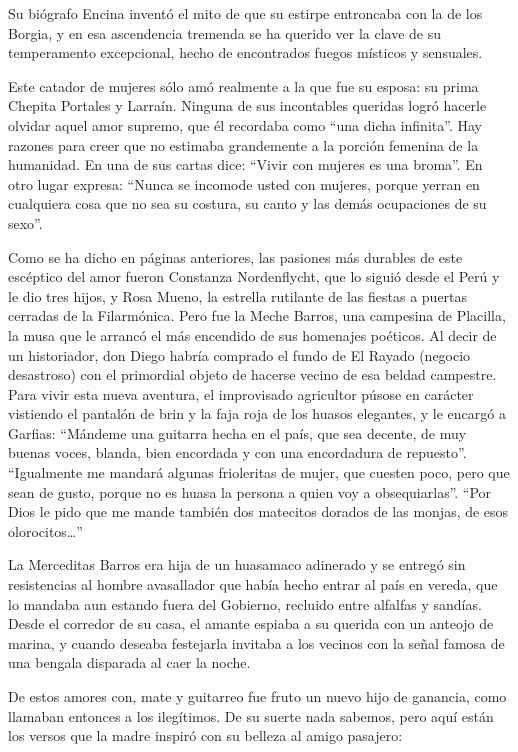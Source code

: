 \documentclass[10pt,twoside,openright]{memoir}
\begin{document}
Su biógrafo Encina inventó el mito de que su estirpe entroncaba con la
de los Borgia, y en esa ascendencia tremenda se ha querido ver la clave
de su temperamento excepcional, hecho de encontrados fuegos místicos y
sensuales.

Este catador de mujeres sólo amó realmente a la que fue su esposa: su
prima Chepita Portales y Larraín. Ninguna de sus incontables queridas
logró hacerle olvidar aquel amor supremo, que él recordaba como ``una
dicha infinita''. Hay razones para creer que no estimaba grandemente a la
porción femenina de la humanidad. En una de sus cartas dice: ``Vivir con
mujeres es una broma''. En otro lugar expresa: ``Nunca se incomode usted
con mujeres, porque yerran en cualquiera cosa que no sea su costura, su
canto y las demás ocupaciones de su sexo''.

Como se ha dicho en páginas anteriores, las pasiones más durables de
este escéptico del amor fueron Constanza Nordenflycht, que lo siguió
desde el Perú y le dio tres hijos, y Rosa Mueno, la estrella rutilante
de las fiestas a puertas cerradas de la Filarmónica. Pero fue la Meche
Barros, una campesina de Placilla, la musa que le arrancó el más
encendido de sus homenajes poéticos. Al decir de un historiador, don
Diego habría comprado el fundo de El Rayado (negocio desastroso) con el
primordial objeto de hacerse vecino de esa beldad campestre. Para vivir
esta nueva aventura, el improvisado agricultor púsose en carácter
vistiendo el pantalón de brin y la faja roja de los huasos elegantes, y
le encargó a Garfias: ``Mándeme una guitarra hecha en el país, que sea
decente, de muy buenas voces, blanda, bien encordada y con una
encordadura de repuesto''. ``Igualmente me mandará algunas frioleritas de
mujer, que cuesten poco, pero que sean de gusto, porque no es huasa la
persona a quien voy a obsequiarlas''. ``Por Dios le pido que me mande
también dos matecitos dorados de las monjas, de esos olorocitos\ldots''

La Merceditas Barros era hija de un huasamaco adinerado y se entregó sin
resistencias al hombre avasallador que había hecho entrar al país en
vereda, que lo mandaba aun estando fuera del Gobierno, recluido entre
alfalfas y sandías. Desde el corredor de su casa, el amante espiaba a su
querida con un anteojo de marina, y cuando deseaba festejarla invitaba a
los vecinos con la señal famosa de una bengala disparada al caer la
noche.

De estos amores con, mate y guitarreo fue fruto un nuevo hijo de
ganancia, como llamaban entonces a los ilegítimos. De su suerte nada
sabemos, pero aquí están los versos que la madre inspiró con su belleza
al amigo pasajero:
\end{document}
